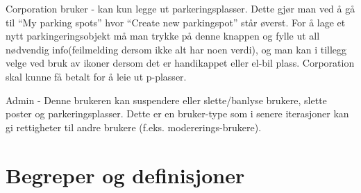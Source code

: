\documentclass[12pt]{article}
\begin{document}
Corporation bruker - kan kun legge ut parkeringsplasser. Dette gjør man ved å gå til “My parking spots” hvor “Create new parkingspot” står øverst. For å lage et nytt parkingeringsobjekt må man trykke på denne knappen og fylle ut all nødvendig info(feilmelding dersom ikke alt har noen verdi), og man kan i tillegg velge ved bruk av ikoner dersom det er handikappet eller el-bil plass. Corporation skal kunne få betalt for å leie ut p-plasser.

Admin - Denne brukeren kan suspendere eller slette/banlyse brukere, slette poster og parkeringsplasser. Dette er en bruker-type som i senere iterasjoner kan gi rettigheter til andre brukere (f.eks. modererings-brukere).


\section{Begreper og definisjoner}
\end{document}
